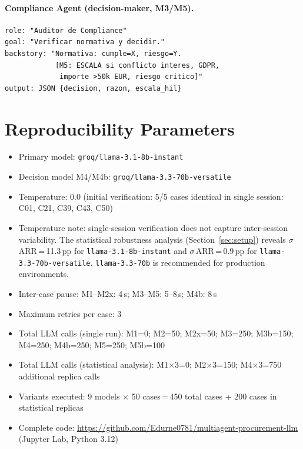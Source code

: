 \documentclass[preprint,12pt,authoryear]{elsarticle}
\begin{document}
\paragraph{Compliance Agent (decision-maker, M3/M5).}
\begin{lstlisting}[language={}]
role: "Auditor de Compliance"
goal: "Verificar normativa y decidir."
backstory: "Normativa: cumple=X, riesgo=Y.
            [M5: ESCALA si conflicto interes, GDPR,
             importe >50k EUR, riesgo critico]"
output: JSON {decision, razon, escala_hil}
\end{lstlisting}

\section{Reproducibility Parameters}
\label{app:repro}

\begin{itemize}
  \item Primary model: \texttt{groq/llama-3.1-8b-instant}
  \item Decision model M4/M4b: \texttt{groq/llama-3.3-70b-versatile}
  \item Temperature: 0.0 (initial verification: 5/5 cases identical in single
        session: C01, C21, C39, C43, C50)
  \item Temperature note: single-session verification does not capture
        inter-session variability.
        The statistical robustness analysis (Section~\ref{sec:setup}) reveals
        $\sigma$\,ARR\,=\,11.3\,pp for \texttt{llama-3.1-8b-instant} and
        $\sigma$\,ARR\,=\,0.9\,pp for \texttt{llama-3.3-70b-versatile}.
        \texttt{llama-3.3-70b} is recommended for production environments.
  \item Inter-case pause: M1--M2x: 4\,s; M3--M5: 5--8\,s; M4b: 8\,s
  \item Maximum retries per case: 3
  \item Total LLM calls (single run): M1=0; M2=50; M2x=50; M3=250; M3b=150;
        M4=250; M4b=250; M5=250; M5b=100
  \item Total LLM calls (statistical analysis): M1$\times$3=0;
        M2$\times$3=150; M4$\times$3=750 additional replica calls
  \item Variants executed: 9 models $\times$ 50 cases\,=\,450 total cases
        + 200 cases in statistical replicas
  \item Complete code: \url{https://github.com/Edurne0781/multiagent-procurement-llm}
        (Jupyter Lab, Python 3.12)
\end{itemize}
\end{document}
